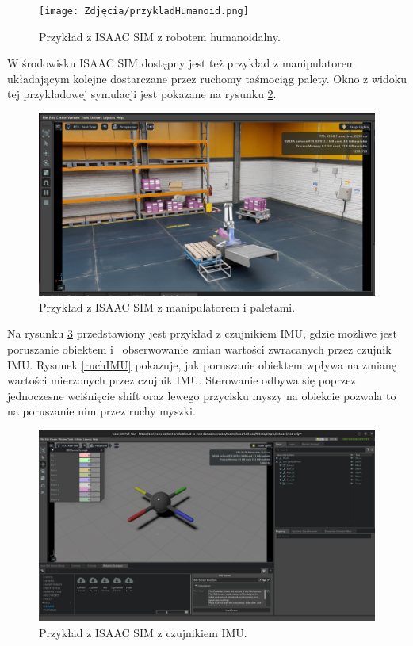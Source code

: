 \documentclass[12pt]{article}
\begin{document}
\begin{figure}[h]
    \centering
    \texttt{[image: Zdjęcia/przykladHumanoid.png]}
    \caption{Przykład z ISAAC SIM z robotem humanoidalny.}
    \label{fig:humanoid}
\end{figure}

W środowisku ISAAC SIM dostępny jest też przykład z manipulatorem układającym kolejne dostarczane przez ruchomy taśmociąg palety. Okno z widoku tej przykładowej symulacji jest pokazane na rysunku \ref{fig:palety}.

\begin{figure}[h]
    \centering
    \includegraphics[width=0.7\linewidth]{Zdjęcia/przykladowaPaletyzacja.png}
    \caption{Przykład z ISAAC SIM z manipulatorem i paletami.}
    \label{fig:palety}
\end{figure}

Na rysunku \ref{IMU} przedstawiony jest przykład z czujnikiem IMU, gdzie możliwe jest poruszanie obiektem i~ obserwowanie zmian wartości zwracanych przez czujnik IMU. Rysunek \ref{ruchIMU} pokazuje, jak poruszanie obiektem wpływa na zmianę wartości mierzonych przez czujnik IMU. Sterowanie odbywa się poprzez jednoczesne wciśnięcie shift oraz lewego przycisku myszy na obiekcie pozwala to na poruszanie nim przez ruchy myszki.

\begin{figure}[h]
    \centering
    \includegraphics[width=0.7\linewidth]{Zdjęcia/czujnikIMU.png}
    \caption{Przykład z ISAAC SIM z czujnikiem IMU.}
    \label{IMU}
\end{figure}
\end{document}
